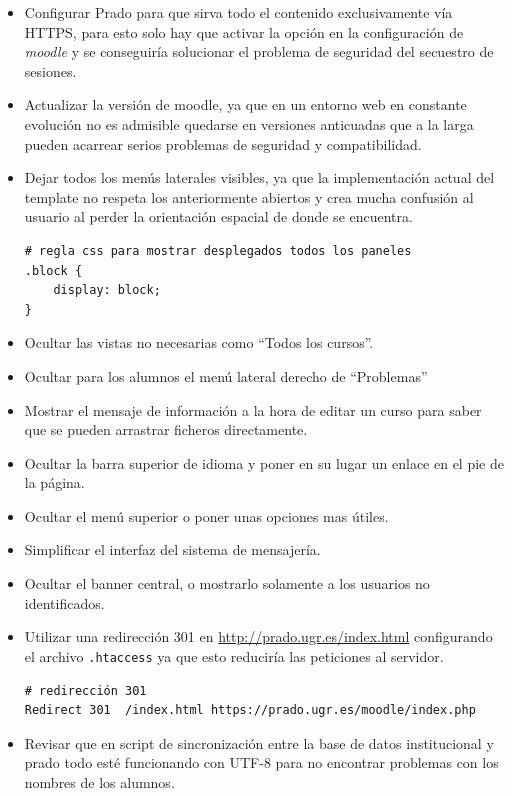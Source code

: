 \begin{itemize}
	\item Configurar Prado para que sirva todo el contenido exclusivamente vía HTTPS, para esto solo hay que activar la opción en la configuración de \textit{moodle} y se conseguiría solucionar el problema de seguridad del secuestro de sesiones.

	\item Actualizar la versión de moodle, ya que en un entorno web en constante evolución no es admisible quedarse en versiones anticuadas que a la larga pueden acarrear serios problemas de seguridad y compatibilidad.

	\item Dejar todos los menús laterales visibles, ya que la implementación actual del template no respeta los anteriormente abiertos y crea mucha confusión al usuario al perder la orientación espacial de donde se encuentra.
\begin{lstlisting}[language=html]
# regla css para mostrar desplegados todos los paneles
.block {
	display: block;
}
\end{lstlisting}

	\item Ocultar las vistas no necesarias como ``Todos los cursos''.
	\item Ocultar para los alumnos el menú lateral derecho de ``Problemas''
	\item Mostrar el mensaje de información a la hora de editar un curso para saber que se pueden arrastrar ficheros directamente.
	\item Ocultar la barra superior de idioma y poner en su lugar un enlace en el pie de la página.
	\item Ocultar el menú superior o poner unas opciones mas útiles.
	\item Simplificar el interfaz del sistema de mensajería.
	\item Ocultar el banner central, o mostrarlo solamente a los usuarios no identificados.
	\item Utilizar una redirección 301 en \url{http://prado.ugr.es/index.html} configurando el archivo \texttt{.htaccess} ya que esto reduciría las peticiones al servidor.
\begin{lstlisting}
# redirección 301
Redirect 301  /index.html https://prado.ugr.es/moodle/index.php
\end{lstlisting}

	\item Revisar que en script de sincronización entre la base de datos institucional y prado todo esté funcionando con UTF-8 para no encontrar problemas con los nombres de los alumnos.



\end{itemize}

